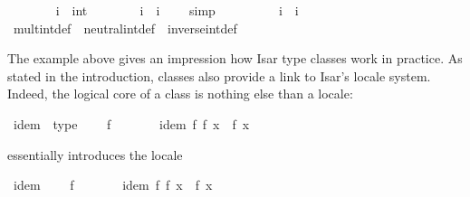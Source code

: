 \begin{isabellebody}
\endisadelimproof
%
\isatagproof
{}\isamarkupfalse%
\isanewline
\ \ \ \ \ \ \isamarkupfalse%
\ i\ {\isacharcolon}{\isacharcolon}\ int\isanewline
\ \ \ \ \ \ \isamarkupfalse%
\ {\isachardoublequoteopen}{\isacharminus}i\ {\isacharplus}\ i\ {\isacharequal}\ {}{\isachardoublequoteclose}\ \isamarkupfalse%
\ simp\isanewline
\ \ \ \ \ \ \isamarkupfalse%
\ \isamarkupfalse%
\ {\isachardoublequoteopen}i{\isasymdiv}\ {\isasymotimes}\ i\ {\isacharequal}\ {\isasymone}{\isachardoublequoteclose}\isanewline
\ \ \ \ \ \ \isamarkupfalse%
\ mult{\isacharunderscore}int{\isacharunderscore}def\ \ neutral{\isacharunderscore}int{\isacharunderscore}def\ \ inverse{\isacharunderscore}int{\isacharunderscore}def\ \isacommand{{\isachardot}}\isamarkupfalse%
\isanewline
\ \ \ \ \isamarkupfalse%
%
\endisatagproof
{\isafoldproof}%
%
\isadelimproof
%
\endisadelimproof
%
\isamarkuptrue%
%
\isamarkuptrue%
%
\begin{isamarkuptext}%
The example above gives an impression how Isar type classes work
  in practice.  As stated in the introduction, classes also provide
  a link to Isar's locale system.  Indeed, the logical core of a class
  is nothing else than a locale:%
\end{isamarkuptext}%
\isamarkuptrue%
\isamarkupfalse%
\ idem\ {\isacharequal}\ type\ {\isacharplus}\isanewline
\ \ \ f\ {\isacharcolon}{\isacharcolon}\ {\isachardoublequoteopen}{\isasymalpha}\ {\isasymRightarrow}\ {\isasymalpha}{\isachardoublequoteclose}\isanewline
\ \ \ idem{\isacharcolon}\ {\isachardoublequoteopen}f\ {\isacharparenleft}f\ x{\isacharparenright}\ {\isacharequal}\ f\ x{\isachardoublequoteclose}%
\begin{isamarkuptext}%
\noindent essentially introduces the locale%
\end{isamarkuptext}%
\isamarkuptrue%
%
\isadelimML
%
\endisadelimML
%
\isatagML
%
\endisatagML
{\isafoldML}%
%
\isadelimML
%
\endisadelimML
{}\isamarkupfalse%
\ idem\ {\isacharequal}\isanewline
\ \ \ f\ {\isacharcolon}{\isacharcolon}\ {\isachardoublequoteopen}{\isasymalpha}\ {\isasymRightarrow}\ {\isasymalpha}{\isachardoublequoteclose}\isanewline
\ \ \ idem{\isacharcolon}\ {\isachardoublequoteopen}f\ {\isacharparenleft}f\ x{\isacharparenright}\ {\isacharequal}\ f\ x{\isachardoublequoteclose}%

\end{isabellebody}
